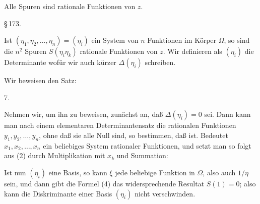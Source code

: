 
Alle Spuren sind rationale Funktionen von $z$.

\S\,173. 

Ist $(\eta_1, \eta_2, \dots, \eta_n) = (\eta_i)$ ein System von $n$ Funktionen im Körper $\Omega$, so sind die $n^2$ Spuren $S(\eta_i \eta_k)$ rationale Funktionen von $z$. Wir definieren als  $(\eta_i)$ die Determinante
wofür wir auch kürzer $\Delta(\eta_i)$ schreiben.

Wir beweisen den Satz:

7. 

Nehmen wir, um ihn zu beweisen, zunächst an, daß $\Delta(\eta_i) = 0$ sei. Dann kann man nach einem elementaren Determinantensatz die rationalen Funktionen $y_1, y_2, \dots, y_n$, ohne daß sie alle Null sind, so bestimmen, daß
ist. Bedeutet $x_1, x_2, \dots, x_n$ ein beliebiges System rationaler Funktionen, und setzt man
so folgt aus (2) durch Multiplikation mit $x_k$ und Summation:

Ist nun $(\eta_i)$ eine Basis, so kann $\xi$ jede beliebige Funktion in $\Omega$, also auch $1/\eta$ sein, und dann gibt die Formel (4) das widersprechende Resultat $S(1) = 0$; also kann die Diskriminante einer Basis $(\eta_i)$ nicht verschwinden.

